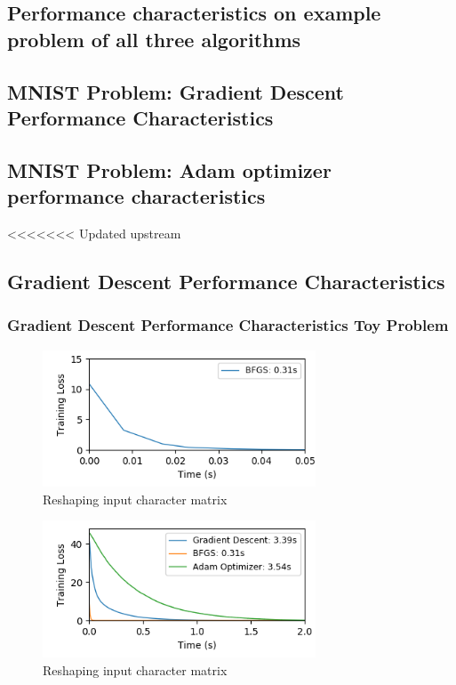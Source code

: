 \documentclass[10pt,twocolumn]{article}
\begin{document}
\subsection{Performance characteristics on example problem of all three algorithms}

\subsection{MNIST Problem: Gradient Descent Performance Characteristics}


\subsection{MNIST Problem: Adam optimizer performance characteristics}

<<<<<<< Updated upstream
\subsection{Gradient Descent Performance Characteristics}




\subsubsection{Gradient Descent Performance Characteristics Toy Problem}


\begin{figure}
\includegraphics[width=3.2in]{./ToyLossBFGS.png}
\caption{Reshaping input character matrix}
\end{figure}


\begin{figure}
\includegraphics[width=3.2in]{./ToyLoss.png}
\caption{Reshaping input character matrix}
\end{figure}
\end{document}
